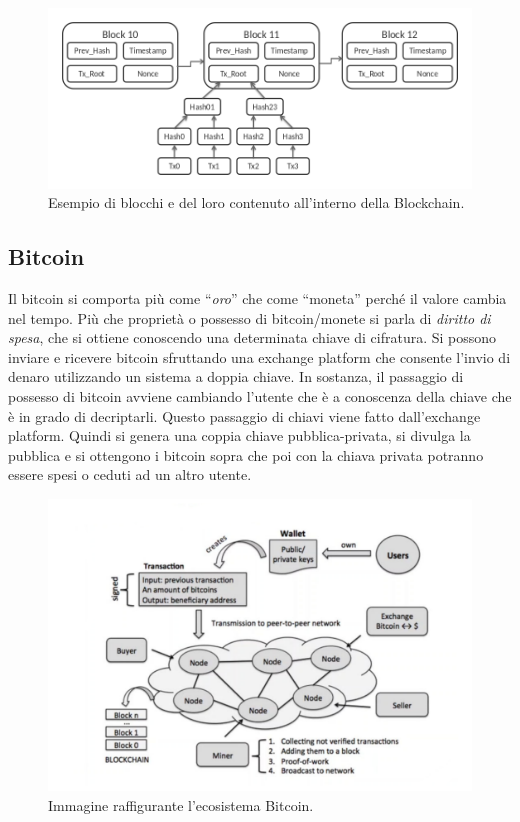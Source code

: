 \begin{figure}[H]
    \centering
    \includegraphics[width=\textwidth, keepaspectratio]{capitoli/bitcoin/imgs/bit1.png}
    \caption{Esempio di blocchi e del loro contenuto all'interno della Blockchain.}
\end{figure}

\subsection{Bitcoin}

Il bitcoin si comporta più come “\textit{oro}” che come “moneta” perché il
valore cambia nel tempo. Più che proprietà o possesso di bitcoin/monete si parla
di \textit{diritto di spesa}, che si ottiene conoscendo una determinata chiave
di cifratura. Si possono inviare e ricevere bitcoin sfruttando una exchange
platform che consente l'invio di denaro utilizzando un sistema a doppia chiave.
In sostanza, il passaggio di possesso di bitcoin avviene cambiando l'utente che
è a conoscenza della chiave che è in grado di decriptarli. Questo passaggio di
chiavi viene fatto dall'exchange platform. Quindi si genera una coppia chiave
pubblica-privata, si divulga la pubblica e si ottengono i bitcoin sopra che poi
con la chiava privata potranno essere spesi o ceduti ad un altro utente.

\begin{figure}[H]
    \centering
    \includegraphics[width=14cm, keepaspectratio]{capitoli/bitcoin/imgs/bit2.png}
    \caption{Immagine raffigurante l'ecosistema Bitcoin.}
\end{figure}

